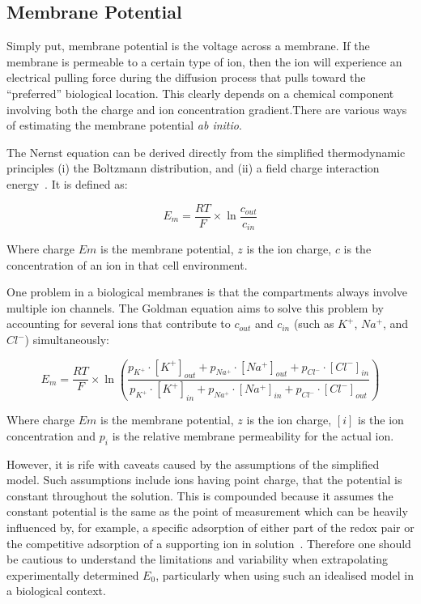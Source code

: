\subsection{Membrane Potential}
Simply put, membrane potential is the voltage across a membrane.
If the membrane is permeable to a certain type of ion, then the ion will experience an electrical pulling force during the diffusion process that pulls toward the ``preferred'' biological location.
This clearly depends on a chemical component involving both the charge and ion concentration gradient.There are various ways of estimating the membrane potential \textit{ ab initio}.

The Nernst equation can be derived directly from the simplified thermodynamic principles (i) the Boltzmann distribution, and (ii) a field charge interaction energy~\cite{Feiner1994}.
It is defined as:

\begin{equation}
{E}_{m}=\frac{RT}{F}\times \ln { \frac{{c}_{out}}{{c}_{in}} }
\end{equation}

Where charge $Em$ is the membrane potential, $z$ is the ion charge, $c$ is the concentration of an ion in that cell environment.

One problem in a biological membranes is that the compartments always  involve multiple ion channels.
The Goldman equation aims to solve this problem by accounting for several ions that contribute to $c_{out}$ and $c_{in}$ (such as $K^+$, $Na^+$, and $Cl^-$) simultaneously:

\begin{equation}
{{E}_{m}}=\frac{RT}{F} \times{\ln}
  \left(\frac{
    {p}_{K^+}\cdot{[K^+]}_{out} + {p}_{Na^+}\cdot{[Na^+]}_{out} + {p}_{Cl^-}\cdot{[Cl^-]}_{in}}
    {{p}_{K^+}\cdot{[K^+]}_{in} + {p}_{Na^+}\cdot{[Na^+]}_{in} + {p}_{Cl^-}\cdot{[Cl^-]}_{out}
    }\right)
\end{equation}

Where charge $Em$ is the membrane potential, $z$ is the ion charge, $[i]$ is the ion concentration and ${p}_{i}$ is the relative membrane permeability for the actual ion.

However, it is rife with caveats caused by the assumptions of the simplified model.
Such assumptions include ions having point charge, that the potential is constant throughout the solution.
This is compounded because it assumes the constant potential is the same as the point of measurement which can be heavily influenced by, for example, a specific adsorption of either part of the redox pair or the competitive adsorption of a supporting ion in solution~\cite{Feiner1994}.
Therefore one should be cautious to understand the limitations and variability when extrapolating experimentally determined ${E}_{0}$, particularly when using such an idealised model in a biological context.

